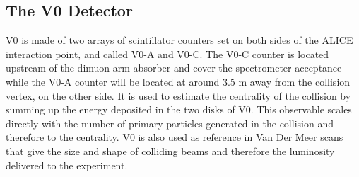 \subsection{The V0 Detector}
V0 is made of two arrays of scintillator counters set on both sides of the ALICE interaction point, and called V0-A and V0-C. The V0-C counter is located upstream of the dimuon arm absorber and cover the spectrometer acceptance while the V0-A counter will be located at around 3.5 m away from the collision vertex, on the other side.
It is used to estimate the centrality of the collision by summing up the energy deposited in the two disks of V0. This observable scales directly with the number of primary particles generated in the collision and therefore to the centrality.
V0 is also used as reference in Van Der Meer scans that give the size and shape of colliding beams and therefore the luminosity delivered to the experiment.